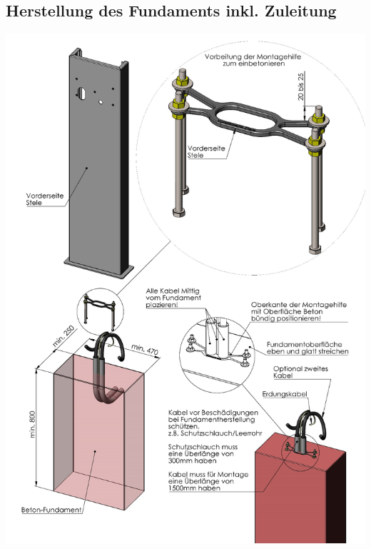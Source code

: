 \documentclass[a4paper,10pt]{article}
\begin{document}
	\subsection*{Herstellung des Fundaments inkl. Zuleitung}
	\label{appendix_base}
	\begin{center}
		\includegraphics[width=0.9\linewidth]{./img/stand_overview}
	\end{center}
\end{document}
